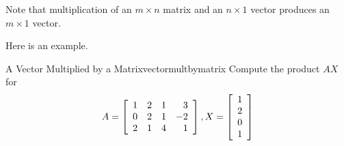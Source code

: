 Note that multiplication of an $m \times n$ matrix and an $n \times 1$ vector produces an $m \times 1$ vector.

Here is an example.

\begin{example}{A Vector Multiplied by a Matrix}{vectormultbymatrix}
Compute the product $AX$ for 
\begin{equation*}
A = \left[
\begin{array}{rrrr}
1 & 2 & 1 & 3 \\
0 & 2 & 1 & -2 \\
2 & 1 & 4 & 1
\end{array}
\right], X =  \left[
\begin{array}{r}
1 \\
2 \\
0 \\
1
\end{array}
\right] 
\end{equation*}
\end{example}


